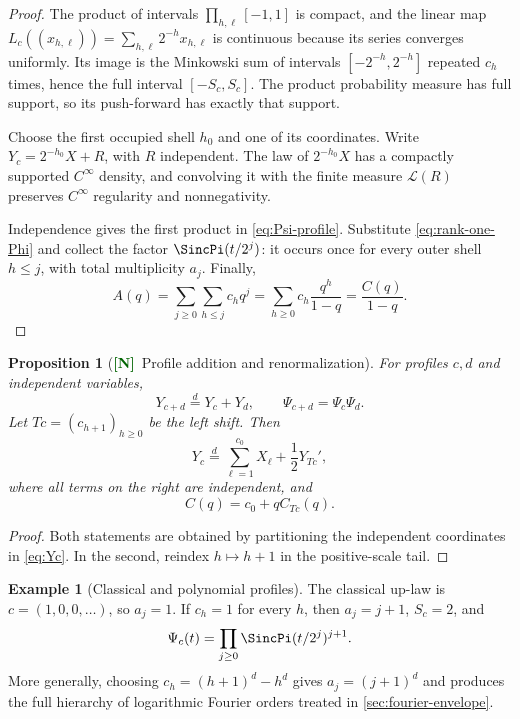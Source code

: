 \documentclass[11pt]{article}
\numberwithin{equation}{section}
\newtheorem{proposition}[theorem]{Proposition}
\theoremstyle{definition}
\newtheorem{example}[theorem]{Example}
\theoremstyle{remark}
\newcommand{\New}{\textcolor{darkgreen}{\textsf{\textbf{[N]}}}}
\begin{document}
\begin{proof}
The product of intervals
$\prod_{h,\ell}[-1,1]$ is compact, and the linear map
$L_c((x_{h,\ell}))=\sum_{h,\ell}2^{-h}x_{h,\ell}$ is continuous because its
series converges uniformly.  Its image is the Minkowski sum of intervals
$[-2^{-h},2^{-h}]$ repeated $c_h$ times, hence the full interval
$[-S_c,S_c]$.  The product probability measure has full support, so its
push-forward has exactly that support.

Choose the first occupied shell $h_0$ and one of its coordinates.  Write
$Y_c=2^{-h_0}X+R$, with $R$ independent.  The law of $2^{-h_0}X$ has a compactly
supported $C^\infty$ density, and convolving it with the finite measure
$\mathcal L(R)$ preserves $C^\infty$ regularity and nonnegativity.

Independence gives the first product in \eqref{eq:Psi-profile}.  Substitute
\eqref{eq:rank-one-Phi} and collect the factor
$\SincPi(t/2^j)$: it occurs once for every outer shell $h\le j$, with total
multiplicity $a_j$.  Finally,
\[
 A(q)=\sum_{j\ge0}\sum_{h\le j}c_hq^j
 =\sum_{h\ge0}c_h\frac{q^h}{1-q}=\frac{C(q)}{1-q}.
\]
\end{proof}

\begin{proposition}[\New\ Profile addition and renormalization]
\label{prop:profile-monoid}
For profiles $c,d$ and independent variables,
\begin{equation}
 Y_{c+d}\stackrel d=Y_c+Y_d,
 \qquad
 \Psi_{c+d}=\Psi_c\Psi_d.
 \label{eq:profile-addition}
\end{equation}
Let $Tc=(c_{h+1})_{h\ge0}$ be the left shift.  Then
\begin{equation}
 Y_c\stackrel d=
 \sum_{\ell=1}^{c_0}X_\ell+\frac12Y_{Tc}',
 \label{eq:profile-renormalization}
\end{equation}
where all terms on the right are independent, and
\begin{equation}
 C(q)=c_0+qC_{Tc}(q).
\end{equation}
\end{proposition}

\begin{proof}
Both statements are obtained by partitioning the independent coordinates in
\eqref{eq:Yc}.  In the second, reindex $h\mapsto h+1$ in the positive-scale
tail.
\end{proof}

\begin{example}[Classical and polynomial profiles]
The classical up-law is $c=(1,0,0,\ldots)$, so $a_j=1$.  If $c_h=1$ for every
$h$, then $a_j=j+1$, $S_c=2$, and
\[
 \Psi_c(t)=\prod_{j\ge0}\SincPi(t/2^j)^{j+1}.
\]
More generally, choosing
$c_h=(h+1)^d-h^d$ gives $a_j=(j+1)^d$ and produces the full hierarchy of
logarithmic Fourier orders treated in \cref{sec:fourier-envelope}.
\end{example}
\end{document}

